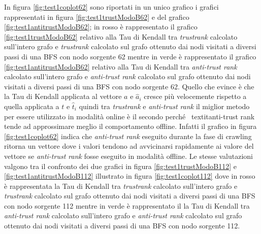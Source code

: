 \newpage
In figura \ref{fig:test1coplot62} sono riportati in un unico grafico i grafici rappresentati in figura \ref{fig:test1trustModoB62} e del  grafico \ref{fig:test1antitrustModoB62}; in rosso è rappresentato il grafico \ref{fig:test1trustModoB62} relativo alla Tau di Kendall tra \textit{trustrank} calcolato sull'intero grafo e \textit{trustrank} calcolato sul grafo ottenuto dai nodi visitati a diversi passi di una BFS con nodo sorgente 62 mentre in verde è rappresentato il grafico  \ref{fig:test1antitrustModoB62} relativo alla Tau di Kendall tra \textit{anti-trust rank} calcolato sull'intero grafo e \textit{anti-trust rank} calcolato sul grafo ottenuto dai nodi visitati a diversi passi di una BFS con nodo sorgente 62. Quello che evince è che la Tau di Kendall applicata al vettore \(a\) e \(\hat{a}_i\) cresce più velocemente rispetto a quella applicata a \(t\) e \(\hat{t}_i\) quindi tra \textit{trustrank} e \textit{anti-trust rank} il miglior metodo per essere utilizzato in modalità online è il secondo perché \
textit{anti-trust rank} tende ad approssimare meglio il comportamento offline. Infatti il grafico in figura \ref{fig:test1coplot62} indica che \textit{anti-trust rank} eseguito durante la fase di crawling ritorna un vettore dove i valori tendono ad avvicinarsi rapidamente ai valore del vettore se \textit{anti-trust rank} fosse eseguito in modalità offline. Le stesse valutazioni valgono tra il confronto dei due grafici in figura \ref{fig:test1trustModoB112} e \ref{fig:test1antitrustModoB112} illustrato in figura \ref{fig:test1coplot112} dove in rosso è rappresentata la Tau di Kendall  tra \textit{trustrank} calcolato sull'intero grafo e \textit{trustrank} calcolato sul grafo ottenuto dai nodi visitati a diversi passi di una BFS con nodo sorgente 112 mentre in verde è rappresentato il la Tau di Kendall tra \textit{anti-trust rank} calcolato sull'intero grafo e \textit{anti-trust rank} calcolato sul grafo ottenuto dai nodi visitati a diversi passi di una BFS con nodo sorgente 112.

